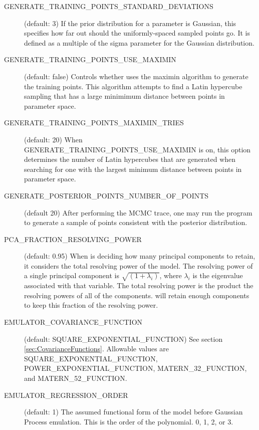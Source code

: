 \begin{description}
    \item[GENERATE\_TRAINING\_POINTS\_STANDARD\_DEVIATIONS] (default: 3) If the prior distribution for a parameter is Gaussian, this specifies how far out should the uniformly-spaced sampled points go. It is defined as a multiple of the sigma parameter for the Gaussian distribution.

    \item[GENERATE\_TRAINING\_POINTS\_USE\_MAXIMIN] (default: false) Controls whether  uses the maximin algorithm to generate the training points. This algorithm attempts to find a Latin hypercube sampling that has a large minimimum distance between points in parameter space.

    \item[GENERATE\_TRAINING\_POINTS\_MAXIMIN\_TRIES] (default: 20) When \newline GENERATE\_TRAINING\_POINTS\_USE\_MAXIMIN is on, this option determines the number of Latin hypercubes that are generated when searching for one with the largest minimum distance between points in parameter space.

    \item[GENERATE\_POSTERIOR\_POINTS\_NUMBER\_OF\_POINTS] (default 20) After performing the MCMC trace, one may run the program  to generate a sample of points consistent with the posterior distribution.

    \item[PCA\_FRACTION\_RESOLVING\_POWER] (default: 0.95)  When  is deciding how many principal components to retain, it considers the total resolving power of the model. The resolving power of a single principal component is $\sqrt{(1 + \lambda_i)}$, where $\lambda_i$ is the eigenvalue associated with that variable. The total resolving power is the product the resolving powers of all of the components.  will retain enough components to keep this fraction of the resolving power.

    \item[EMULATOR\_COVARIANCE\_FUNCTION] (default: SQUARE\_EXPONENTIAL\_FUNCTION) See section \ref{sec:CovarianceFunctions}. Allowable values are SQUARE\_EXPONENTIAL\_FUNCTION, \newline POWER\_EXPONENTIAL\_FUNCTION, MATERN\_32\_FUNCTION, and \newline MATERN\_52\_FUNCTION.

    \item[EMULATOR\_REGRESSION\_ORDER] (default: 1) The assumed functional form of the model before Gaussian Process emulation. This is the order of the polynomial. 0, 1, 2, or 3.


\end{description}
